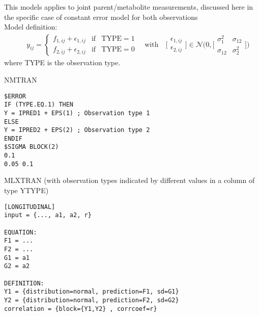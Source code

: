 This models applies to joint  parent/metabolite measurements, discussed here 
in the specific case of constant error model for both observations\\
\bigskip
Model definition:
\begin{eqnarray}
&& y_{ij} = \left\{ \begin{array}{rcl}  f_{1,ij} + \epsilon_{1,ij} & \mbox{if}  & \mbox{TYPE}  = 1 \\
f_{2,ij} + \epsilon_{2,ij}    & \mbox{if} & \mbox{TYPE}  = 0  
\end{array}\right. \quad \mbox{with} \quad 
\bigg[ \begin{array}{l}  \epsilon_{1,ij} \\
\epsilon_{2,ij}   \nonumber
\end{array} \bigg]
\in \mathcal{N} 
\Bigg( 0, \bigg[ \begin{array}{ll} \sigma_1^2 & \sigma_{12} \\ \sigma_{12} & \sigma_2^2 \end{array}  \bigg] \Bigg)
\end{eqnarray}
where TYPE is the observation type.

\bigskip

\begin{lrbox}{\lstbox}\begin{minipage}{16cm}
NMTRAN
\begin{lstlisting}[frame=single,language=NM]
$ERROR
IF (TYPE.EQ.1) THEN
Y = IPRED1 + EPS(1) ; Observation type 1
ELSE
Y = IPRED2 + EPS(2) ; Observation type 2
ENDIF
$SIGMA BLOCK(2)
0.1
0.05 0.1
\end{lstlisting}   
\end{minipage}\end{lrbox}
\usebox\lstbox

\begin{lrbox}{\lstbox}\begin{minipage}{16cm}
MLXTRAN (with observation types indicated by different values in a column of type YTYPE)
\begin{lstlisting}[frame=single,language=MLX]
[LONGITUDINAL]
input = {..., a1, a2, r}

EQUATION:
F1 = ...
F2 = ...
G1 = a1
G2 = a2

DEFINITION:
Y1 = {distribution=normal, prediction=F1, sd=G1}
Y2 = {distribution=normal, prediction=F2, sd=G2}
correlation = {block={Y1,Y2} , corrcoef=r}

\end{lstlisting}   
\end{minipage}\end{lrbox}
\usebox\lstbox



